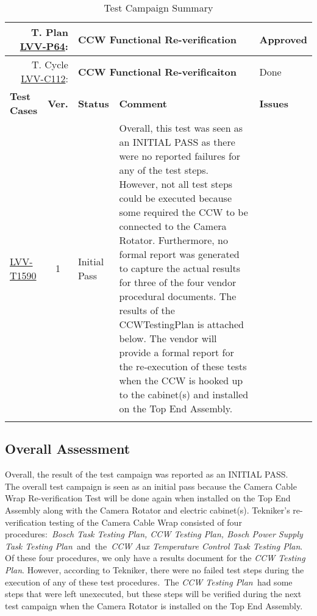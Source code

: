 \documentclass[SE,lsstdraft,STR,toc]{lsstdoc}
\begin{document}
{\small
\begin{longtable}{p{2cm}cp{2.3cm}p{8.6cm}p{2.3cm}}
\toprule
\multicolumn{2}{r}{ T. Plan \href{https://jira.lsstcorp.org/secure/Tests.jspa\#/testPlan/LVV-P64}{LVV-P64}:} &
\multicolumn{2}{p{10.9cm}}{\textbf{ CCW Functional Re-verification }} & Approved \\\hline
\multicolumn{2}{r}{ T. Cycle \href{https://jira.lsstcorp.org/secure/Tests.jspa\#/testCycle/LVV-C112}{LVV-C112}:} &
\multicolumn{2}{p{10.9cm}}{\textbf{ CCW Functional Re-verificaiton }} & Done \\\hline
\textbf{Test Cases} &  \textbf{Ver.} & \textbf{Status} & \textbf{Comment} & \textbf{Issues} \\\toprule
\href{https://jira.lsstcorp.org/secure/Tests.jspa#/testCase/LVV-T1590}{LVV-T1590}
&  1
& Initial Pass &
\begin{minipage}[]{9cm}
\smallskip
Overall, this test was seen as an INITIAL PASS as there were no reported
failures for any of the test steps. However, not all test steps could be
executed because some required the CCW to be connected to the Camera
Rotator. Furthermore, no formal report was generated to capture the
actual results for three of the four vendor procedural documents. The
results of the CCWTestingPlan is attached below. The vendor will provide
a formal report for the re-execution of these tests when the CCW is
hooked up to the cabinet(s) and installed on the Top End Assembly.~
\medskip
\end{minipage}
&
\\\hline
\caption{Test Campaign Summary}
\label{table:summary}
\end{longtable}
}

\subsection{Overall Assessment}
\label{sect:overallassessment}

Overall, the result of the test campaign was reported as an INITIAL
PASS.\\[2\baselineskip]The overall test campaign is seen as an initial
pass because the Camera Cable Wrap Re-verification Test will be done
again when installed on the Top End Assembly along with the Camera
Rotator and electric cabinet(s). Tekniker's re-verification testing of
the Camera Cable Wrap consisted of four procedures:\emph{~Bosch Task
Testing Plan, CCW Testing Plan, Bosch Power Supply Task Testing
Plan~}and\emph{~}the\emph{~CCW Aux Temperature Control Task Testing
Plan}. Of these four procedures, we only have a results document for the
\emph{CCW Testing Plan}. However, according to Tekniker, there were no
failed test steps during the execution of any of these test
procedures\emph{.~}The \emph{CCW Testing Plan~}had some steps that were
left unexecuted, but these steps will be verified during the next test
campaign when the Camera Rotator is installed on the Top End Assembly.
\end{document}
